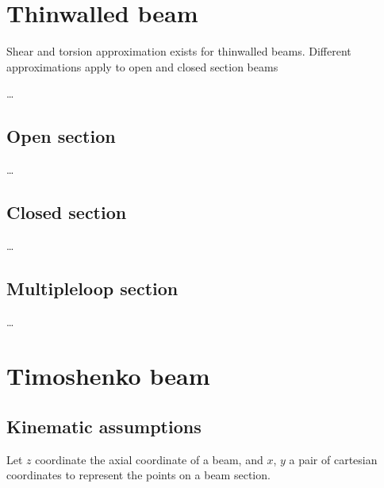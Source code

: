 \documentclass[letterpaper,10pt,english]{jupyterBook}
\begin{document}
\section{Thin\sphinxhyphen{}walled beam}
\label{\detokenize{ch/solids/beams/thin-walled:thin-walled-beam}}\label{\detokenize{ch/solids/beams/thin-walled:solid-mechanics-small-displacements-beams-thin-walled}}\label{\detokenize{ch/solids/beams/thin-walled::doc}}
\sphinxAtStartPar
Shear and torsion approximation exists for thin\sphinxhyphen{}walled beams. Different approximations apply to open and closed section beams

\sphinxAtStartPar
…


\subsection{Open section}
\label{\detokenize{ch/solids/beams/thin-walled:open-section}}
\sphinxAtStartPar
…


\subsection{Closed section}
\label{\detokenize{ch/solids/beams/thin-walled:closed-section}}
\sphinxAtStartPar
…


\subsection{Multiple\sphinxhyphen{}loop section}
\label{\detokenize{ch/solids/beams/thin-walled:multiple-loop-section}}
\sphinxAtStartPar
…

\sphinxstepscope


\section{Timoshenko beam}
\label{\detokenize{ch/solids/beams/timoshenko:timoshenko-beam}}\label{\detokenize{ch/solids/beams/timoshenko:solid-mechanics-small-displacements-beams-timoshenko}}\label{\detokenize{ch/solids/beams/timoshenko::doc}}

\subsection{Kinematic assumptions}
\label{\detokenize{ch/solids/beams/timoshenko:kinematic-assumptions}}
\sphinxAtStartPar
Let \(z\) coordinate the axial coordinate of a beam, and \(x\), \(y\) a pair of cartesian coordinates to represent the points on a beam section.
\end{document}
